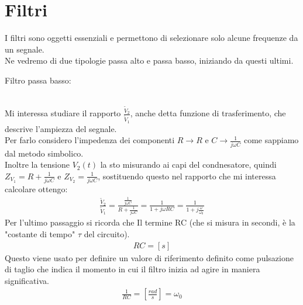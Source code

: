 \documentclass[a4paper, oneside]{article}
\begin{document}
\section*{Filtri}
I filtri sono oggetti essenziali e permettono di selezionare solo alcune frequenze da un segnale.\\
Ne vedremo di due tipologie passa alto e passa basso, iniziando da questi ultimi.\\
\begin{center}
    Filtro passa basso:\\\hfill\\
\end{center}
Mi interessa studiare il rapporto $\frac{\widetilde{V}_2}{\widetilde{V}_1}$, anche detta funzione di trasferimento, che descrive l'ampiezza del segnale.\\
Per farlo considero l'impedenza dei componenti $R \to R$ e $C \to \frac{1}{j\omega C}$ come sappiamo dal metodo simbolico.\\
Inoltre la tensione $V_2(t)$ la sto misurando ai capi del condnesatore, quindi $Z_{V_1} = R + \frac{1}{j \omega C}$ e $Z_{V_2} = \frac{1}{j \omega C}$, sostituendo questo nel rapporto che mi interessa calcolare ottengo:
\begin{gather*}
    \frac{\widetilde{V}_2}{\widetilde{V}_1} = \frac{\frac{1}{j \omega C}}{R + \frac{1}{j \omega C}} = \frac{1}{1 + j \omega R C} = \frac{1}{1+j \frac{\omega}{\omega_0}}
\end{gather*}
Per l'ultimo passaggio si ricorda che Il termine RC (che si misura in secondi, è la "costante di tempo" $\tau$ del circuito).
\begin{gather*}
    R C = [ s ]
\end{gather*}
Questo viene usato per definire un valore di riferimento definito come pulsazione di taglio che indica il momento in cui il filtro inizia ad agire in maniera significativa.\\
\begin{gather*}
    \frac{1}{RC} = [\frac{rad}{s}] = \omega_0
\end{gather*}
\end{document}
